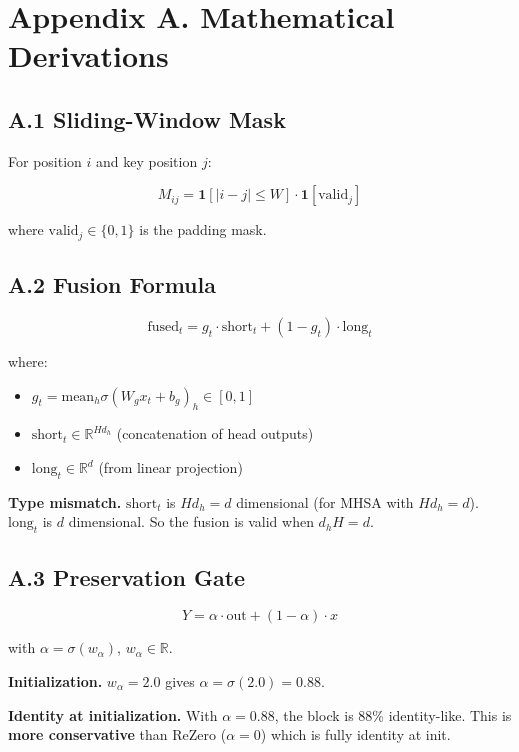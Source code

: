 
\section{Appendix A. Mathematical Derivations}

\subsection{A.1 Sliding-Window Mask}

For position $i$ and key position $j$:

\[
M_{ij} = \mathbf{1}\left[|i - j| \leq W\right] \cdot \mathbf{1}\left[\text{valid}_j\right]
\tag{A.1}
\]

where $\text{valid}_j \in \{0, 1\}$ is the padding mask.

\subsection{A.2 Fusion Formula}

\[
\text{fused}_t = g_t \cdot \text{short}_t + (1 - g_t) \cdot \text{long}_t
\tag{A.2}
\]

where:
\begin{itemize}
\item $g_t = \text{mean}_h \sigma(W_g x_t + b_g)_h \in [0, 1]$
\item $\text{short}_t \in \mathbb{R}^{H d_h}$ (concatenation of head outputs)
\item $\text{long}_t \in \mathbb{R}^{d}$ (from linear projection)

\end{itemize}
\textbf{Type mismatch.} $\text{short}_t$ is $H d_h = d$ dimensional (for MHSA 
with $H d_h = d$). $\text{long}_t$ is $d$ dimensional. So the fusion is 
valid when $d_h H = d$.

\subsection{A.3 Preservation Gate}

\[
Y = \alpha \cdot \text{out} + (1 - \alpha) \cdot x
\tag{A.3}
\]

with $\alpha = \sigma(w_\alpha)$, $w_\alpha \in \mathbb{R}$.

\textbf{Initialization.} $w_\alpha = 2.0$ gives $\alpha = \sigma(2.0) = 0.88$.

\textbf{Identity at initialization.} With $\alpha = 0.88$, the block is 88\% 
identity-like. This is \textbf{more conservative} than ReZero ($\alpha = 0$) 
which is fully identity at init.

